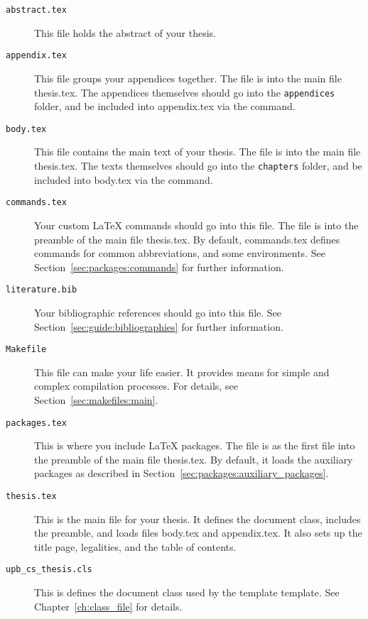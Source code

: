 \begin{description}
	\item[\texttt{abstract.tex}] This file holds the abstract of your
	thesis.

	\item[\texttt{appendix.tex}] This file groups your appendices together.
	The file is \verb++ into the main file \mbox{thesis.tex}.
	The appendices themselves should go into the \texttt{appendices}
	folder, and be included into \mbox{appendix.tex} via the \verb++
	command.

	\item[\texttt{body.tex}] This file contains the main text of your
	thesis.
	The file is \verb++ into the main file \mbox{thesis.tex}.
	The texts themselves should go into the \texttt{chapters} folder, and be
	included into \mbox{body.tex} via the \verb++ command.

	\item[\texttt{commands.tex}] Your custom \LaTeX{} commands should go
	into this file.
	The file is \verb++ into the preamble of the main file
	\mbox{thesis.tex}.
	By default, \mbox{commands.tex} defines commands for common
	abbreviations, and some environments.
	See Section~\ref{sec:packages:commands} for further information.

	\item[\texttt{literature.bib}] Your bibliographic references should go
	into this file.
	See Section~\ref{sec:guide:bibliographies} for further information.

	\item[\texttt{Makefile}] This file can make your life easier. It
	provides means for simple and complex compilation processes. For
	details, see Section~\ref{sec:makefiles:main}.

	\item[\texttt{packages.tex}] This is where you include \LaTeX{}
	packages.
	The file is \verb++ as the first file into the preamble of the
	main file \mbox{thesis.tex}.
	By default, it loads the auxiliary packages as described in
	Section~\ref{sec:packages:auxiliary_packages}.

	\item[\texttt{thesis.tex}] This is the main file for your thesis.
	It defines the document class, includes the preamble, and loads files
	\mbox{body.tex} and \mbox{appendix.tex}.
	It also sets up the title page, legalities, and the table of contents.

	\item[\texttt{upb\_cs\_thesis.cls}] This is defines the document class
	used by the \ac{template} template.
	See Chapter~\ref{ch:class_file} for details.
\end{description}



